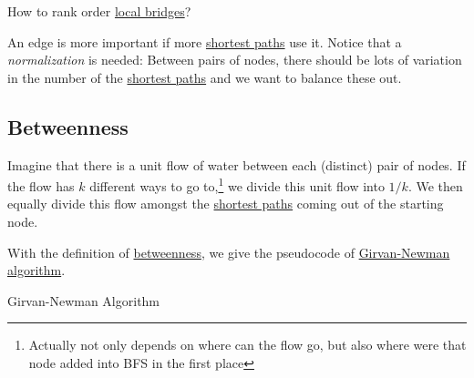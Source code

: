 \begin{problem}
How to rank order \hyperref[def:local-bridge]{local bridges}?
\end{problem}

\begin{intuition}
	An edge is more important if more \hyperref[def:shortest-path]{shortest paths} use it. Notice that a \emph{normalization} is needed:
	Between pairs of nodes, there should be lots of variation in the number of the \hyperref[def:shortest-path]{shortest paths} and we want to balance these out.
\end{intuition}

\subsection{Betweenness}
\begin{definition}[Betweenness]\label{def:betweenness}
	Imagine that there is a unit flow of water between each (distinct) pair of nodes. If the flow has \(k\) different ways to go to,\footnote{Actually not only depends on where can the flow go, but also where were that node added into BFS in the first place}
	we divide this unit flow into \(1/k\). We then equally divide this flow amongst the \hyperref[def:shortest-path]{shortest paths} coming out of the starting node.
\end{definition}

With the definition of \hyperref[def:betweenness]{betweenness}, we give the pseudocode of \hyperref[algo:Girvan-Newman-algorithm]{Girvan-Newman algorithm}.

\par
\begin{algorithm}[H]\label{algo:Girvan-Newman-algorithm}
	\DontPrintSemicolon
	\caption{Girvan-Newman Algorithm}
	\BlankLine

	\;
	\Return{}\;
\end{algorithm}

